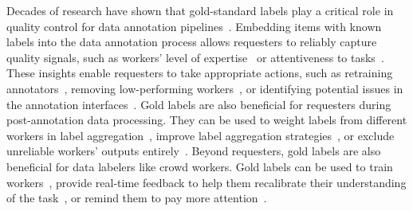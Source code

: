 Decades of research have shown that gold-standard labels play a critical role in quality control for data annotation pipelines~\cite{han2020crowd,gadiraju2015training,le2010ensuring,doroudi2016toward,hettiachchi2021challenge}.
Embedding items with known labels into the data annotation process allows requesters to reliably capture quality signals, 
such as workers' level of expertise~\cite{abraham2016many, abassi2019worker, yang2018improving} %
or attentiveness to tasks~\cite{hettiachchi2021challenge, oleson2011programmatic}. %
These insights enable requesters to take appropriate actions, such as 
retraining annotators~\cite{le2010ensuring, doroudi2016toward,hettiachchi2021challenge}, %
removing low-performing workers~\cite{10.1145/3613904.3642834, snow2008cheap,downs2010your,le2010ensuring}, %
or identifying potential issues in the annotation interfaces~\cite{toomim2011utility,10.1145/3613904.3642834, rahmanian2014user, komarov2013crowdsourcing}. %
Gold labels are also beneficial for requesters during post-annotation data processing. 
They can be used to weight labels from different workers in label aggregation~\cite{abassi2017gold,abassi2019worker}, %
improve label aggregation strategies~\cite{khattak2011quality, snow2008cheap},  %
or 
exclude unreliable workers' outputs entirely~\cite{abassi2019worker}. %
Beyond requesters, gold labels are also beneficial for data labelers like crowd workers. 
Gold labels can be used to train workers~\cite{doroudi2016toward, le2010ensuring, gadiraju2015training,han2020crowd}, %
provide real-time feedback to help them recalibrate their understanding of the task~\cite{le2010ensuring,hettiachchi2021challenge}, %
or remind them to pay more attention~\cite{ hettiachchi2021challenge,oleson2011programmatic}. %


